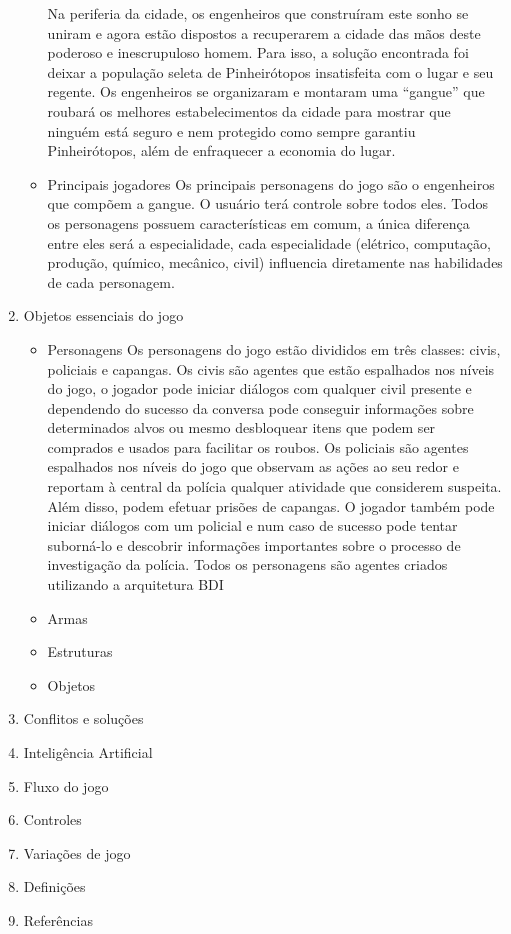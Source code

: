 \begin{enumerate}
\begin{itemize}
Na periferia da cidade, os engenheiros que construíram este sonho se uniram e agora estão dispostos a recuperarem a cidade das mãos deste poderoso e inescrupuloso homem. Para isso, a solução encontrada foi deixar a população seleta de Pinheirótopos insatisfeita com o lugar e seu regente. Os engenheiros se organizaram e montaram uma “gangue” que roubará os melhores estabelecimentos da cidade para mostrar que ninguém está seguro e nem protegido como sempre garantiu Pinheirótopos, além de enfraquecer a economia do lugar.
\item Principais jogadores
Os principais personagens do jogo são o engenheiros que compõem a gangue. O usuário terá controle sobre todos eles.
Todos os personagens possuem características em comum, a única diferença entre eles será a especialidade, cada especialidade (elétrico, computação, produção, químico, mecânico, civil) influencia diretamente nas habilidades de cada personagem.
\end{itemize}
\item Objetos essenciais do jogo
\begin{itemize}
\item Personagens
Os personagens do jogo estão divididos em três classes: civis, policiais e capangas.
Os civis são agentes que estão espalhados nos níveis do jogo, o jogador pode iniciar diálogos com qualquer civil presente e dependendo do sucesso da conversa pode conseguir informações sobre determinados alvos ou mesmo desbloquear itens que podem ser comprados e usados para facilitar os roubos.
Os policiais são agentes espalhados nos níveis do jogo que observam as ações ao seu redor e reportam à central da polícia qualquer atividade que considerem suspeita. Além disso, podem efetuar prisões de capangas. O jogador também pode iniciar diálogos com um policial e num caso de sucesso pode tentar suborná-lo e descobrir informações importantes sobre o processo de investigação da polícia.
Todos os personagens são agentes criados utilizando a arquitetura BDI
\item Armas
\item Estruturas
\item Objetos
\end{itemize}
\item Conflitos e soluções
\item Inteligência Artificial
\item Fluxo do jogo
\item Controles
\item Variações de jogo
\item Definições
\item Referências
\end{enumerate}